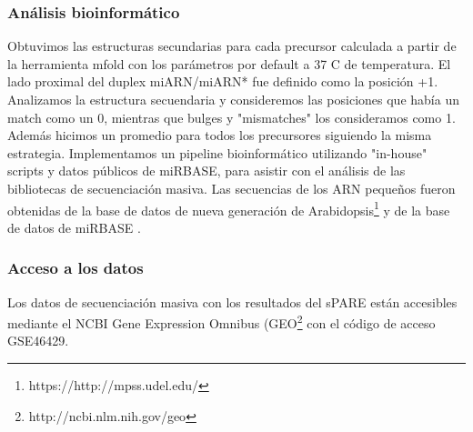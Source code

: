 \subsubsection{Análisis bioinformático}

Obtuvimos las estructuras secundarias para cada precursor calculada a partir de la herramienta mfold \citep{pmid12824337} con los parámetros por default a 37 \degree C de temperatura.
El lado proximal del duplex miARN/miARN* fue definido como la posición +1.
Analizamos la estructura secuendaria y consideremos las posiciones que había un match como un 0, mientras que bulges y "mismatches" los consideramos como 1.
Además hicimos un promedio para todos los precursores siguiendo la misma estrategia.
Implementamos un pipeline bioinformático utilizando "in-house" scripts y datos públicos de miRBASE, para asistir con el análisis de las bibliotecas de secuenciación masiva.
Las secuencias de los ARN pequeños fueron obtenidas de la base de datos de nueva generación de Arabidopsis\footnote{https://http://mpss.udel.edu/} \citep{pmid25120269} y  de la base de datos de miRBASE \citep{Kozomara2014}.

\subsubsection{Acceso a los datos}
Los datos de secuenciación masiva con los resultados del sPARE están accesibles mediante el NCBI Gene Expression Omnibus (GEO\footnote{http://ncbi.nlm.nih.gov/geo} con el código de acceso GSE46429.


